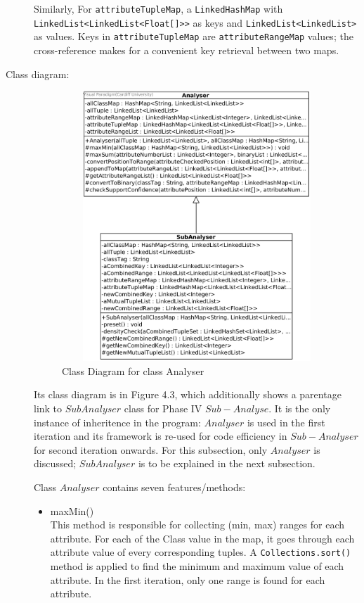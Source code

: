 \begin{description}
Similarly, For \texttt{attributeTupleMap}, a \texttt{LinkedHashMap} with \texttt{LinkedList<LinkedList<Float[]>>} as keys and \texttt{LinkedList<LinkedList>} as values. Keys in \texttt{attributeTupleMap} are \texttt{attributeRangeMap} values; the cross-reference makes for a convenient key retrieval between two maps. 

\item[Class diagram: ] 

\begin{figure}[h]
    \centering
    \includegraphics[width=4.5in, height=4in]{figures/class_analyser}
    \caption[Class Diagram for class Analyser]{Class Diagram for class Analyser}
    \label{fig:figure4_3}
\end{figure}

Its class diagram is in Figure 4.3, which additionally shows a parentage link to $SubAnalyser$ class for Phase IV $Sub-Analyse$. It is the only instance of inheritence in the program: $Analyser$ is used in the first iteration and its framework is re-used for code efficiency in $Sub-Analyser$ for second iteration onwards. For this subsection, only $Analyser$ is discussed; $SubAnalyser$ is to be explained in the next subsection.

Class $Analyser$ contains seven features/methods:

\begin{itemize}
	\item{maxMin()} \\
	This method is responsible for collecting (min, max) ranges for each attribute. For each of the Class value in the map, it goes through each attribute value of every corresponding tuples. A \texttt{Collections.sort()} method is applied to find the minimum and maximum value of each attribute. In the first iteration, only one range is found for each attribute.
	

\end{itemize}
\end{description}
